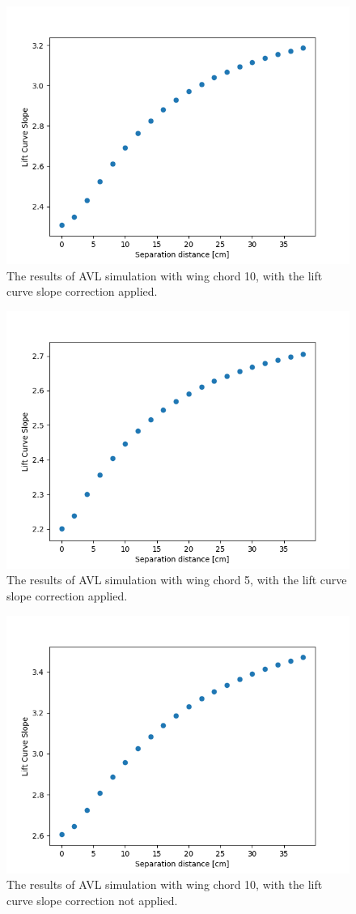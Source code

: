 \documentclass[12pt]{report} %
\begin{document}
\begin{figure}
\includegraphics[width = 0.7\linewidth]{fl_chord10.png}
\caption{The results of AVL simulation with wing chord 10, with the lift curve slope correction applied.}
\label{10cm_corrected}
\end{figure}

\begin{figure}
\includegraphics[width = 0.7\linewidth]{fl_chord5.png}
\caption{The results of AVL simulation with wing chord 5, with the lift curve slope correction applied.}
\label{5cm_corrected}
\end{figure}

\begin{figure}
\includegraphics[width = 0.7\linewidth]{fl_chord10_cla2pi.png}
\caption{The results of AVL simulation with wing chord 10, with the lift curve slope correction not applied.}
\label{10cm_uncorrected}
\end{figure}
\end{document}
